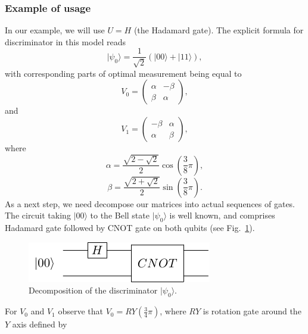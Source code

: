 \documentclass[preprint,12pt, a4paper, dvipsnames]{elsarticle}
\newcommand{\ket}[1]{\ensuremath{|#1\rangle}}
\newcommand{\1}{{\rm 1\hspace{-0.9mm}l}}
\begin{document}
\subsubsection{Example of usage}
In our example, we will use $U =  H$ (the Hadamard gate).
The explicit formula for discriminator in this model reads
\begin{equation}
\ket{\psi_0} = \frac{1}{\sqrt{2}} (\ket{00} + \ket{11}),
\end{equation}
with corresponding parts of optimal measurement being equal to
\begin{equation}
V_0 =
\left(\begin{array}{cc} \alpha & -\beta\\ \beta & \alpha \end{array}\right),
\end{equation}
and \begin{equation}
V_1 =
\left(\begin{array}{cc} -\beta & \alpha \\ \alpha & \beta \end{array}\right),
\end{equation}
where \begin{equation}
\alpha = \frac{\sqrt{2 - \sqrt{2}}}{2} \cos\left( \frac{3}{8} \pi \right),
\end{equation}
\begin{equation}
\beta  = \frac{\sqrt{2  + \sqrt{2}}}{2} \sin\left( \frac{3}{8} \pi \right).
\end{equation}
As a next step, we need decompose our matrices into actual sequences of gates.
The circuit taking $\ket{00}$ to the Bell state $\ket{\psi_0}$ is well known, and comprises Hadamard gate followed by CNOT gate on both qubits (see Fig.~\ref{fig:discriminator}).
\begin{figure}[h!]
	\centering
	\includegraphics[scale=1.7]{pics/discriminator}
	\caption{Decomposition of the discriminator $\ket{\psi_0}$. }
	\label{fig:discriminator}
\end{figure}
For $V_0$ and $V_1$ observe that $V_0 = RY\left(\frac{3}{4} \pi \right) $, where $RY$ is rotation gate around the $Y$ axis defined by
\end{document}
